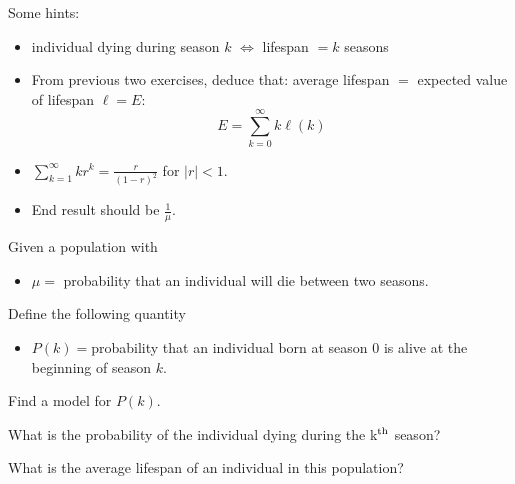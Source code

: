 \begin{annotation}
\begin{goals}
	Some hints:
	\begin{itemize}
		\item individual dying during season $k$ $\Leftrightarrow$ lifespan $= k$ seasons
		\item From previous two exercises, deduce that: average lifespan $=$ expected value of lifespan $\ell = E$:
		$$ E = \sum_{k=0}^\infty k \ell(k) $$
		\item $\displaystyle \sum_{k=1}^\infty k r^k = \frac{r}{(1-r)^2}$ for $|r|<1$.
		\item End result should be $\frac1\mu$.
\end{itemize}	
\end{goals}
\end{annotation}
\question
	Given a population with
	\begin{itemize}
		\item $\mu=$ probability that an individual will die between two seasons.
	\end{itemize}
\begin{parts}
	\item Define the following quantity
	\begin{itemize}
		\item $P(k)=$probability that an individual born at season $0$ is alive at the beginning of season $k$.
	\end{itemize}
	Find a model for $P(k)$.

	\item What is the probability of the individual dying during the k$^{\rm th}$ season?
	\item What is the average lifespan of an individual in this population?
\end{parts}




\bookonlynewpage




